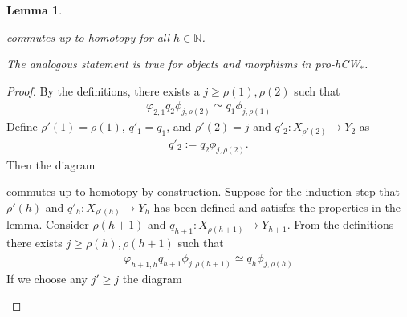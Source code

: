 \documentclass[a4paper,11pt]{article}
\theoremstyle{definition}
\theoremstyle{plain}
\newtheorem{lemma}[definition]{Lemma}
\theoremstyle{remark}
\begin{document}
{\begin{lemma}
\begin{itemize}
\begin{figure}[H]
\center
{}
\end{figure}
commutes up to homotopy for all $h\in \mathbb{N}$. 
\end{itemize}
The analogous statement is true for objects and morphisms in pro-hCW$_{\ast}$. 
\end{lemma}

\begin{proof}By the definitions, there exists a $j\geq \rho(1),\rho(2)$ such that
\begin{align*}
\varphi_{2,1}q_2\phi_{j,\rho(2)} \simeq q_1 \phi_{j,\rho(1)}
\end{align*}
Define $\rho'(1) = \rho(1)$, $q'_{1}=q_{1}$, and $\rho'(2) = j$ and $q'_{2}: X_{\rho'(2)}\rightarrow Y_{2}$ as 
\begin{align*}
q'_{2}:= q_{2} \phi_{j,\rho(2)}.  
\end{align*}
Then the diagram

\begin{figure}[H]
\center
{}
\end{figure}
commutes up to homotopy by construction. Suppose for the induction step that $\rho'(h)$ and $q'_h: X_{\rho'(h)}\rightarrow Y_{h}$ has been defined and satisfes the properties in the lemma. Consider $\rho(h+1)$ and $q_{h+1}: X_{\rho(h+1)}\rightarrow Y_{h+1}$. From the definitions there exists $j\geq \rho(h), \rho(h+1)$ such that 
\begin{align*}
\varphi_{h+1,h}q_{h+1}\phi_{j,\rho(h+1)} \simeq q_h \phi_{j,\rho(h)}
\end{align*}
If we choose any $j'\geq j$ the diagram 


\begin{figure}[H]
\center
{}
 \end{figure}
 

\end{proof}}
\end{document}

